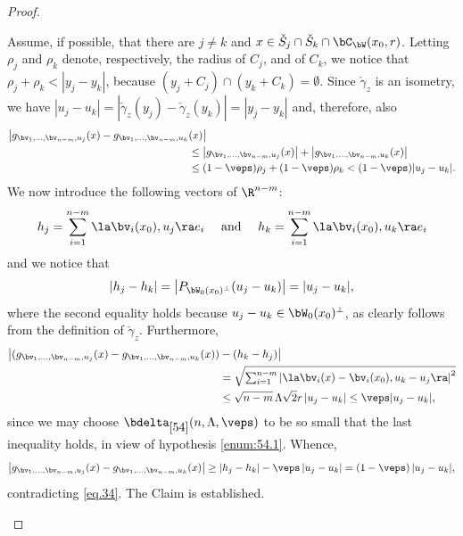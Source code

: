 \begin{proof}
\begin{Empty*}[Claim. \normalfont\emph{The sets $\check{S}_k \cap \bC_\bW(x_0,r)$, $k=1,2,\ldots$, are pairwise disjoint.}]
Assume, if possible, that there are $j \neq k$ and $x \in \check{S}_j \cap \check{S}_k \cap \bC_\bW(x_0,r)$.
Letting~$\rho_j$ and $\rho_k$ denote, respectively, the radius of $C_j$, and of $C_k$, we notice that $\rho_j + \rho_k < |y_j-y_k|$, because $(y_j+C_j) \cap (y_k+C_k) = \emptyset$.
Since $\check{\gamma}_z$ is an isometry, we have $|u_j-u_k| = \left| \check{\gamma}_z(y_j) - \check{\gamma}_z(y_k)\right| = |y_j-y_k|$ and, therefore, also
\begin{equation}
\label{eq.34}
\begin{split}
\bigl| g_{\bv_1,\ldots,\bv_{n-m},u_j}(x) - g_{\bv_1,\ldots,\bv_{n-m},u_k}&(x)\bigr|\\
&\leq \left| g_{\bv_1,\ldots,\bv_{n-m},u_j}(x) \right| + \left| g_{\bv_1,\ldots,\bv_{n-m},u_k}(x) \right|\\
&\leq (1-\veps)\rho_j + (1-\veps)\rho_k < (1-\veps) | u_j - u_k |.
\end{split}
\end{equation}
We now introduce the following vectors of $\R^{n-m}$:
\begin{equation*}
h_j = \sum_{i=1}^{n-m} \la \bv_i(x_0),u_j \ra e_i \quad \text{ and } \quad h_k = \sum_{i=1}^{n-m} \la \bv_i(x_0),u_k \ra e_i
\end{equation*}
and we notice that
\begin{equation*}
\left| h_j - h_k \right| = \left| P_{\bW_0(x_0)^\perp}(u_j-u_k)\right| = |u_j-u_k|,
\end{equation*}
where the second equality holds because $u_j-u_k \in \bW_0(x_0)^\perp$, as clearly follows from the definition of $\check{\gamma}_z$.
Furthermore,
\begin{align*}
\bigl|(g_{\bv_1,\ldots,\bv_{n-m},u_j}(x) - g_{\bv_1,\ldots,\bv_{n-m},u_k}(x)) &-(h_k - h_j) \bigr|\\
&= \sqrt{\textstyle\sum_{i=1}^{n-m} \left| \la \bv_i(x) - \bv_i(x_0), u_k-u_j \ra\right|^2}\\
&\leq \sqrt{n-m}\, \Lambda \sqrt{2} r \left| u_j - u_k \right| \leq \veps | u_j - u_k |,
\end{align*}
since we may choose $\bdelta_{\ref{54}}(n,\Lambda,\veps)$ to be so small that the last inequality holds, in view of hypothesis \eqref{enum:54.1}.
Whence,
\begin{equation*}
\left| g_{\bv_1,\ldots,\bv_{n-m},u_j}(x) - g_{\bv_1,\ldots,\bv_{n-m},u_k}(x)\right| \geq \left| h_j - h_k \right| - \veps \left| u_j - u_k \right| = (1-\veps) \,| u_j - u_k |,
\end{equation*}
contradicting \eqref{eq.34}.
The Claim is established.
\end{Empty*}


\end{proof}
